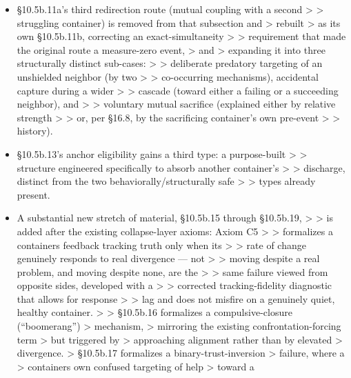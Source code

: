 \documentclass[
]{article}
\begin{document}
\begin{itemize}
\item
  §10.5b.11a's third redirection route (mutual coupling with a second
  \textgreater{} \textgreater{} struggling container) is removed from
  that subsection and \textgreater{} rebuilt \textgreater{} as its own
  §10.5b.11b, correcting an exact-simultaneity \textgreater{}
  \textgreater{} requirement that made the original route a measure-zero
  event, \textgreater{} and \textgreater{} expanding it into three
  structurally distinct sub-cases: \textgreater{} \textgreater{}
  deliberate predatory targeting of an unshielded neighbor (by two
  \textgreater{} \textgreater{} co-occurring mechanisms), accidental
  capture during a wider \textgreater{} \textgreater{} cascade (toward
  either a failing or a succeeding neighbor), and \textgreater{}
  \textgreater{} voluntary mutual sacrifice (explained either by
  relative strength \textgreater{} \textgreater{} or, per §16.8, by the
  sacrificing container's own pre-event \textgreater{} \textgreater{}
  history).
\item
  §10.5b.13's anchor eligibility gains a third type: a purpose-built
  \textgreater{} \textgreater{} structure engineered specifically to
  absorb another container's \textgreater{} \textgreater{} discharge,
  distinct from the two behaviorally/structurally safe \textgreater{}
  \textgreater{} types already present.
\item
  A substantial new stretch of material, §10.5b.15 through §10.5b.19,
  \textgreater{} \textgreater{} is added after the existing
  collapse-layer axioms: Axiom C5 \textgreater{} \textgreater{}
  formalizes a containers feedback tracking truth only when its
  \textgreater{} \textgreater{} rate of change genuinely responds to
  real divergence --- not \textgreater{} \textgreater{} moving despite a
  real problem, and moving despite none, are the \textgreater{}
  \textgreater{} same failure viewed from opposite sides, developed with
  a \textgreater{} \textgreater{} corrected tracking-fidelity diagnostic
  that allows for response \textgreater{} \textgreater{} lag and does
  not misfire on a genuinely quiet, healthy container. \textgreater{}
  \textgreater{} §10.5b.16 formalizes a compulsive-closure
  (``boomerang'') \textgreater{} mechanism, \textgreater{} mirroring the
  existing confrontation-forcing term \textgreater{} but triggered by
  \textgreater{} approaching alignment rather than by elevated
  \textgreater{} divergence. \textgreater{} §10.5b.17 formalizes a
  binary-trust-inversion \textgreater{} failure, where a \textgreater{}
  containers own confused targeting of help \textgreater{} toward a

\end{itemize}
\end{document}
